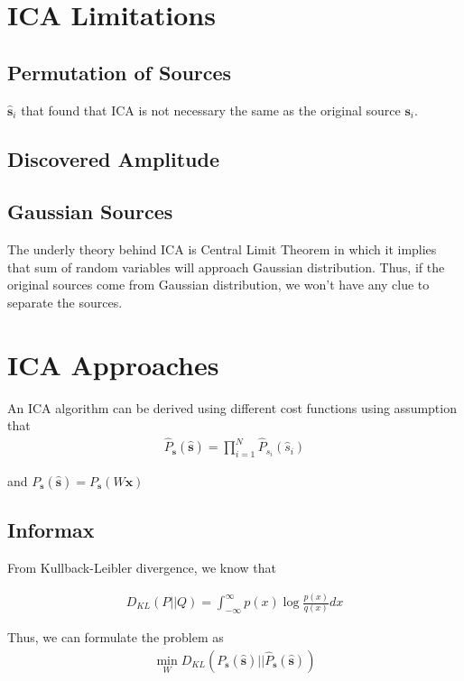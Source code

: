 \section{ICA Limitations}
\subsection{Permutation of Sources}
$\boldsymbol{\hat{s}}_i$ that found that ICA is not necessary the same as the original source $\boldsymbol{s}_i$.
\subsection{Discovered Amplitude}
\subsection{Gaussian Sources}
The underly theory behind ICA is Central Limit Theorem in which it implies that  sum of random variables will approach Gaussian distribution. Thus, if the original sources come from Gaussian distribution, we won't have any clue to separate the sources.


\section{ICA Approaches}
An ICA algorithm can be derived using different cost functions using assumption that 
\begin{align*}
	\hat{P}_{\boldsymbol{s}}(\boldsymbol{\hat{s}}) = \prod_{i=1}^N \hat{P}_{s_i}(\hat{s}_i)
\end{align*}

and ${P}_{\boldsymbol{s}}(\boldsymbol{\hat{s}}) = P_{\boldsymbol{s}}(W\boldsymbol{x})$

\subsection{Informax}
From Kullback-Leibler divergence, we know that 

\begin{align*}
D_{KL}(P||Q) = \int_{-\infty}^{\infty}  p(x) \log \frac{ p(x) } { q(x) } dx	
\end{align*}

Thus, we can formulate the problem as
\begin{align*}
\min_{W} D_{KL} ( P_{\boldsymbol{s}}(\boldsymbol{\hat{s}}) || \hat{P}_{\boldsymbol{s}}(\boldsymbol{\hat{s}}) )
\end{align*}

